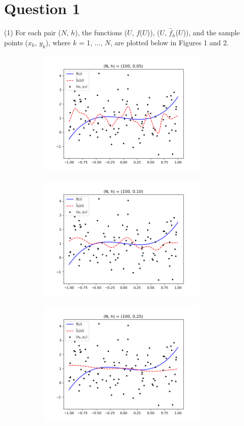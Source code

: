 \section*{Question 1}
(1) For each pair ($N$, $h$), the functions ($U$, $f$($U$)), ($U$, $\hat{f}_{h}$($U$)), and the sample points ($x_{k}$, $y_{k}$), where $k$ = 1, ..., $N$, are plotted below in Figures 1 and 2.
\begin{figure}[h!]
    \centering
    \begin{subfigure}[h]{0.5\textwidth}
        \centering
        \includegraphics[height=2.4in]{Figure_1.png}
    \end{subfigure}%
    \begin{subfigure}[h]{0.5\textwidth}
        \centering
        \includegraphics[height=2.4in]{Figure_2.png}
    \end{subfigure}
    \begin{subfigure}[h]{0.5\textwidth}
        \centering
        \includegraphics[height=2.4in]{Figure_3.png}

\end{subfigure}
\end{figure}
